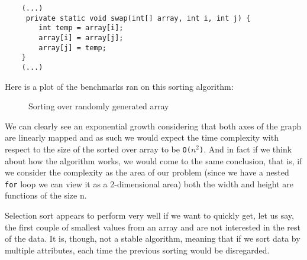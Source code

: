 \documentclass[a4paper,11pt]{article}
\begin{document}
\begin{verbatim}
    (...)
     private static void swap(int[] array, int i, int j) {
        int temp = array[i];
        array[i] = array[j];
        array[j] = temp;
    }
    (...)
\end{verbatim} 

Here is a plot of the benchmarks ran on this sorting algorithm:

\begin{figure}[H]
    \centering
    \caption{Sorting over randomly generated array}
    \label{fig:plot1}
\end{figure}

We can clearly see an exponential growth considering that both axes of the graph are linearly mapped and as such we would expect the time complexity with respect to the size of the sorted over array to be {\tt O(\begin{math} n^2\end{math})}. And in fact if we think about how the algorithm works, we would come to the same conclusion, that is, if we consider the complexity as the area of our problem (since we have a nested {\tt for} loop we can view it as a 2-dimensional area) both the width and height are functions of the size n. 

Selection sort appears to perform very well if we want to quickly get, let us say, the first couple of smallest values from an array and are not interested in the rest of the data. It is, though, not a stable algorithm, meaning that if we sort data by multiple attributes, each time the previous sorting would be disregarded.
\end{document}
